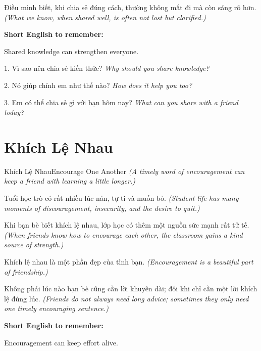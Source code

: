 \begin{baihoc}
Điều mình biết, khi chia sẻ đúng cách, thường không mất đi mà còn sáng rõ hơn.
\textit{(What we know, when shared well, is often not lost but clarified.)}
\end{baihoc}

\begin{ghinhoanh}
\textbf{Short English to remember:}

Shared knowledge can strengthen everyone.

\end{ghinhoanh}

\begin{tuhocnhanh}
1. Vì sao nên chia sẻ kiến thức? \textit{Why should you share knowledge?}

2. Nó giúp chính em như thế nào? \textit{How does it help you too?}

3. Em có thể chia sẻ gì với bạn hôm nay? \textit{What can you share with a friend today?}
\end{tuhocnhanh}
\ngancach

\section{Khích Lệ Nhau}
\begin{truyen}{Khích Lệ Nhau}{Encourage One Another}
\textit{(A timely word of encouragement can keep a friend with learning a little longer.)}

Tuổi học trò có rất nhiều lúc nản, tự ti và muốn bỏ.
\textit{(Student life has many moments of discouragement, insecurity, and the desire to quit.)}

Khi bạn bè biết khích lệ nhau, lớp học có thêm một nguồn sức mạnh rất tử tế.
\textit{(When friends know how to encourage each other, the classroom gains a kind source of strength.)}

Khích lệ nhau là một phần đẹp của tình bạn.
\textit{(Encouragement is a beautiful part of friendship.)}
\end{truyen}

\begin{baihoc}
Không phải lúc nào bạn bè cũng cần lời khuyên dài; đôi khi chỉ cần một lời khích lệ đúng lúc.
\textit{(Friends do not always need long advice; sometimes they only need one timely encouraging sentence.)}
\end{baihoc}

\begin{ghinhoanh}
\textbf{Short English to remember:}

Encouragement can keep effort alive.

\end{ghinhoanh}

